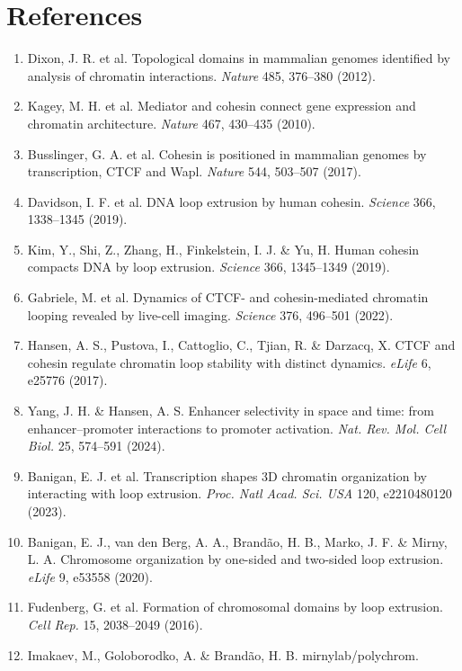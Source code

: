\documentclass[11pt]{article}
\begin{document}
\section*{References}
\begin{enumerate}\setlength{\itemsep}{2pt}
\item Dixon, J. R. et al. Topological domains in mammalian genomes identified by
analysis of chromatin interactions. \textit{Nature} 485, 376--380 (2012).
\item Kagey, M. H. et al. Mediator and cohesin connect gene expression and
chromatin architecture. \textit{Nature} 467, 430--435 (2010).
\item Busslinger, G. A. et al. Cohesin is positioned in mammalian genomes by
transcription, CTCF and Wapl. \textit{Nature} 544, 503--507 (2017).
\item Davidson, I. F. et al. DNA loop extrusion by human cohesin. \textit{Science}
366, 1338--1345 (2019).
\item Kim, Y., Shi, Z., Zhang, H., Finkelstein, I. J. \& Yu, H. Human cohesin
compacts DNA by loop extrusion. \textit{Science} 366, 1345--1349 (2019).
\item Gabriele, M. et al. Dynamics of CTCF- and cohesin-mediated chromatin looping
revealed by live-cell imaging. \textit{Science} 376, 496--501 (2022).
\item Hansen, A. S., Pustova, I., Cattoglio, C., Tjian, R. \& Darzacq, X. CTCF and
cohesin regulate chromatin loop stability with distinct dynamics. \textit{eLife} 6,
e25776 (2017).
\item Yang, J. H. \& Hansen, A. S. Enhancer selectivity in space and time: from
enhancer--promoter interactions to promoter activation. \textit{Nat. Rev. Mol. Cell
Biol.} 25, 574--591 (2024).
\item Banigan, E. J. et al. Transcription shapes 3D chromatin organization by
interacting with loop extrusion. \textit{Proc. Natl Acad. Sci. USA} 120, e2210480120
(2023).
\item Banigan, E. J., van den Berg, A. A., Brand\~{a}o, H. B., Marko, J. F. \&
Mirny, L. A. Chromosome organization by one-sided and two-sided loop extrusion.
\textit{eLife} 9, e53558 (2020).
\item Fudenberg, G. et al. Formation of chromosomal domains by loop extrusion.
\textit{Cell Rep.} 15, 2038--2049 (2016).
\item Imakaev, M., Goloborodko, A. \& Brand\~{a}o, H. B. mirnylab/polychrom.

\end{enumerate}
\end{document}
